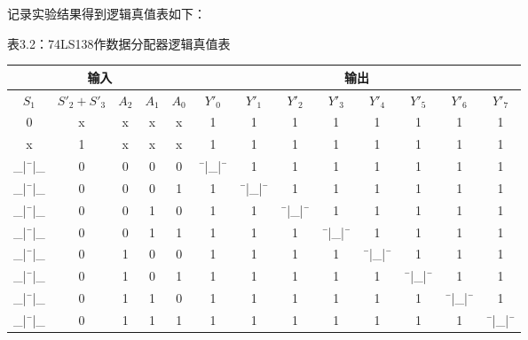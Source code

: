 \documentclass{ctexart}
\begin{document}
    记录实验结果得到逻辑真值表如下：
\begin{table}[!ht]
\centering  表3.2：74LS138作数据分配器逻辑真值表

\begin{tabular}{|ccccc|cccccccc|}
\hline
\multicolumn{5}{|c|}{输入}                                                                 & \multicolumn{8}{c|}{输出}                                               \\ \hline
\multicolumn{1}{|c|}{$S_1$}   & \multicolumn{1}{c|}{$S'_2+S'_3$} & $A_2$ & $A_1$ & $A_0$ & $Y'_0$ & $Y'_1$ & $Y'_2$ & $Y'_3$ & $Y'_4$ & $Y'_5$ & $Y'_6$ & $Y'_7$ \\ \hline
\multicolumn{1}{|c|}{0}       & \multicolumn{1}{c|}{x}           & x     & x     & x     & 1      & 1      & 1      & 1      & 1      & 1      & 1      & 1      \\ \hline
\multicolumn{1}{|c|}{x}       & \multicolumn{1}{c|}{1}           & x     & x     & x     & 1      & 1      & 1      & 1      & 1      & 1      & 1      & 1      \\ \hline
\multicolumn{1}{|c|}{\_|¯|\_} & \multicolumn{1}{c|}{0}           & 0     & 0     & 0     & ¯|\_|¯ & 1      & 1      & 1      & 1      & 1      & 1      & 1      \\ \hline
\multicolumn{1}{|c|}{\_|¯|\_} & \multicolumn{1}{c|}{0}           & 0     & 0     & 1     & 1      & ¯|\_|¯ & 1      & 1      & 1      & 1      & 1      & 1      \\ \hline
\multicolumn{1}{|c|}{\_|¯|\_} & \multicolumn{1}{c|}{0}           & 0     & 1     & 0     & 1      & 1      & ¯|\_|¯ & 1      & 1      & 1      & 1      & 1      \\ \hline
\multicolumn{1}{|c|}{\_|¯|\_} & \multicolumn{1}{c|}{0}           & 0     & 1     & 1     & 1      & 1      & 1      & ¯|\_|¯ & 1      & 1      & 1      & 1      \\ \hline
\multicolumn{1}{|c|}{\_|¯|\_} & \multicolumn{1}{c|}{0}           & 1     & 0     & 0     & 1      & 1      & 1      & 1      & ¯|\_|¯ & 1      & 1      & 1      \\ \hline
\multicolumn{1}{|c|}{\_|¯|\_} & \multicolumn{1}{c|}{0}           & 1     & 0     & 1     & 1      & 1      & 1      & 1      & 1      & ¯|\_|¯ & 1      & 1    \\ \hline
\multicolumn{1}{|c|}{\_|¯|\_} & \multicolumn{1}{c|}{0}           & 1     & 1     & 0     & 1      & 1      & 1      & 1      & 1      & 1      & ¯|\_|¯ & 1      \\ \hline
\multicolumn{1}{|c|}{\_|¯|\_} & \multicolumn{1}{c|}{0}           & 1     & 1     & 1     & 1      & 1      & 1      & 1      & 1      & 1      & 1      & ¯|\_|¯ \\ \hline
\end{tabular}
\end{table}
\end{document}
